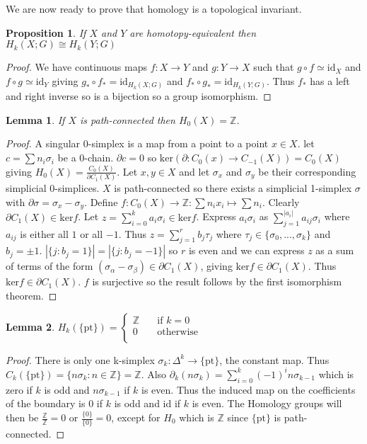 \documentclass{report}
\newtheorem{lemma}{Lemma}
\newtheorem{proposition}{Proposition}
\begin{document}
\noindent We are now ready to prove that homology is a topological invariant.
\begin{proposition}
If $X$ and $Y$ are homotopy-equivalent then $H_k(X;G)\cong H_k(Y;G)$
\end{proposition}
\begin{proof}
We have continuous maps $f\colon X\to Y$ and $g\colon Y\to X$ such that $g\circ f\simeq\text{id}_X$ and $f\circ g\simeq\text{id}_Y$ giving $g_*\circ f_*=\text{id}_{H_k(X;G)}$ and $f_*\circ g_*=\text{id}_{H_k(Y;G)}$. Thus $f_*$ has a left and right inverse so is a bijection so a group isomorphism.
\end{proof}

\begin{lemma}
If $X$ is path-connected then $H_0(X)=\mathbb{Z}$.
\end{lemma}
\begin{proof}
A singular 0-simplex is a map from a point to a point $x\in X$. let $c=\sum n_i\sigma_i$ be a 0-chain. $\partial c=0$ so $\text{ker}(\partial:C_{0}(x)\rightarrow C_{-1}(X))=C_0(X)$ giving $H_0(X)=\frac{C_0(X)}{\partial C_1(X)}$. Let $x,y\in X$ and let $\sigma_x$ and $\sigma_y$ be their corresponding simplicial 0-simplices. $X$ is path-connected so there exists a simplicial 1-simplex $\sigma$ with $\partial\sigma=\sigma_x-\sigma_y$. Define $f\colon C_0(X)\to\mathbb{Z}:\sum n_ix_i\mapsto\sum n_i$. Clearly $\partial C_1(X)\in \text{ker}f$. Let $z=\sum_{i=0}^ka_i\sigma_i\in\text{ker}f$. Express $a_i\sigma_i$ as $\sum_{j=1}^{|a_i|}a_{ij}\sigma_i$ where $a_{ij}$ is either all $1$ or all $-1$. Thus $z=\sum_{j=1}^rb_j\tau_j$ where $\tau_j\in\{\sigma_0,...,\sigma_k\}$ and $b_j=\pm1$. $|\{j:b_j=1\}|=|\{j:b_j=-1\}|$ so $r$ is even and we can express $z$ as a sum of terms of the form $(\sigma_\alpha - \sigma_\beta)\in\partial C_1(X)$, giving $\text{ker}f\in\partial C_1(X)$. Thus $\text{ker}f\in\partial C_1(X)$. $f$ is surjective so the result follows by the first isomorphism theorem.
\end{proof}

\begin{lemma}
$H_k(\{\text{pt}\})=\begin{cases}
       \mathbb{Z} &\quad\text{if }k=0 \\
       0 &\quad\text{otherwise} \\ 
     \end{cases}$
\end{lemma}
\begin{proof}
There is only one k-simplex $\sigma_k\colon\Delta^k\rightarrow \{\text{pt}\}$, the constant map. Thus $C_k(\{\text{pt}\})=\{n\sigma_k:n\in\mathbb{Z}\}=\mathbb{Z}$.
Also $\partial_k(n\sigma_k)=\sum_{i=0}^k(-1)^i n\sigma_{k-1}$ which is zero if $k$ is odd and $n\sigma_{k-1}$ if $k$ is even. Thus the induced map on the coefficients of the boundary is $0$ if $k$ is odd and id if $k$ is even. The Homology groups will then be $\frac{\mathbb{Z}}{\mathbb{Z}}=0$ or $\frac{\{0\}}{\{0\}}=0$, except for $H_0$ which is $\mathbb{Z}$ since $\{\text{pt}\}$ is path-connected.
\end{proof}
\end{document}

